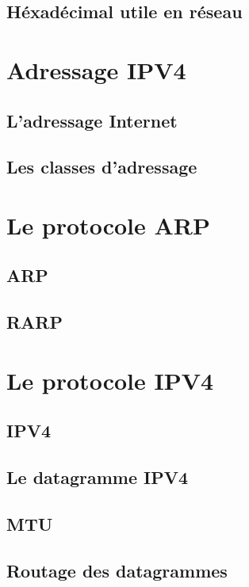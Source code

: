 \documentclass[12pt]{article}
\begin{document}
\subsection{Héxadécimal utile en réseau}


\section{Adressage IPV4}

\subsection{L’adressage Internet}

\subsection{Les classes d'adressage}

\section{Le protocole ARP}

\subsection{ARP}

\subsection{RARP}

\section{Le protocole IPV4}

\subsection{IPV4}

\subsection{Le datagramme IPV4}

\subsection{MTU}

\subsection{Routage des datagrammes}
\end{document}
